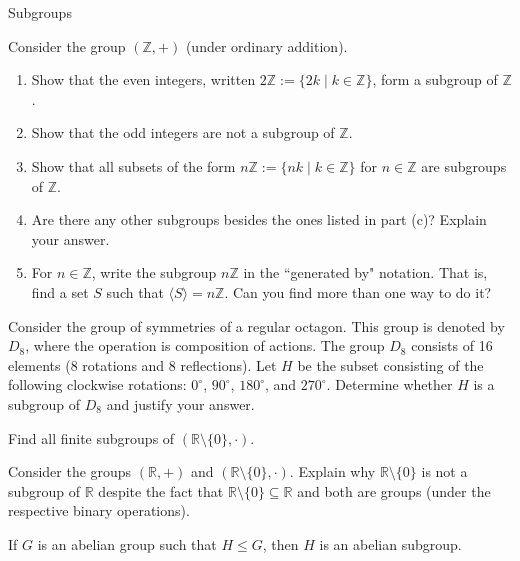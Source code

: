 \begin{section}{Subgroups}
\begin{problem}\label{prob:nZ}
Consider the group $(\mathbb{Z},+)$ (under ordinary addition).
\begin{enumerate}[label=\textrm{(\alph*)}]
\item Show that the even integers, written $2\mathbb{Z}:=\{2k\mid k\in\mathbb{Z}\}$, form a subgroup of $\mathbb{Z}$.
\item Show that the odd integers are not a subgroup of $\mathbb{Z}$.
\item Show that all subsets of the form $n\mathbb{Z}:=\{nk\mid k\in\mathbb{Z}\}$ for $n\in\mathbb{Z}$ are subgroups of $\mathbb{Z}$.
\item\label{prob:nZothers} Are there any other subgroups besides the ones listed in part (c)?  Explain your answer.
\item For $n\in \mathbb{Z}$, write the subgroup $n\mathbb{Z}$ in the ``generated by" notation.  That is, find a set $S$ such that $\langle S\rangle =n\mathbb{Z}$.  Can you find more than one way to do it?
\end{enumerate}
\end{problem}

\begin{problem}
Consider the group of symmetries of a regular octagon.  This group is denoted by $D_8$, where the operation is composition of actions.  The group $D_8$ consists of 16 elements (8 rotations and 8 reflections).  Let $H$ be the subset consisting of the following clockwise rotations: $0^\circ$, $90^\circ$, $180^\circ$, and $270^\circ$.  Determine whether $H$ is a subgroup of $D_8$ and justify your answer.
\end{problem}

\begin{problem}
Find all finite subgroups of $(\mathbb{R}\setminus\{0\},\cdot)$.
\end{problem}

\begin{problem}
Consider the groups $(\mathbb{R},+)$ and $(\mathbb{R}\setminus\{0\},\cdot)$.  Explain why $\mathbb{R}\setminus\{0\}$ is not a subgroup of $\mathbb{R}$ despite the fact that $\mathbb{R}\setminus\{0\}\subseteq\mathbb{R}$ and both are groups (under the respective binary operations).
\end{problem}

\begin{theorem}
If $G$ is an abelian group such that $H\leq G$, then $H$ is an abelian subgroup.
\end{theorem}


\end{section}
